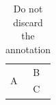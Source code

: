 \begin{table}[t]
\caption{Do not discard the annotation}
\begin{tabular}{ll}
\multirow{2}{*}{A} IMPORTANT & B \\
 & C \\
\end{tabular}
\end{table}
